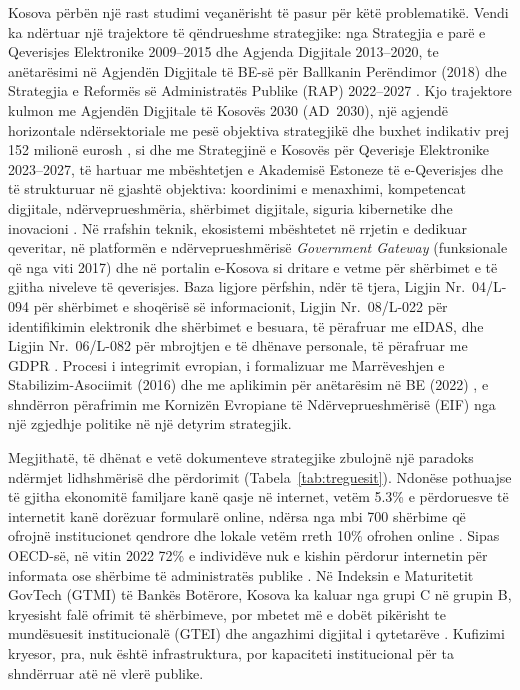\documentclass[conference]{IEEEtran}
\begin{document}
Kosova përbën një rast studimi veçanërisht të pasur për këtë problematikë.
Vendi ka ndërtuar një trajektore të qëndrueshme strategjike: nga Strategjia
e parë e Qeverisjes Elektronike 2009--2015 dhe Agjenda Digjitale 2013--2020,
te anëtarësimi në Agjendën Digjitale të BE-së për Ballkanin Perëndimor
(2018) dhe Strategjia e Reformës së Administratës Publike (RAP) 2022--2027
\cite{strategjia2023}. Kjo trajektore kulmon me Agjendën Digjitale të
Kosovës 2030 (AD~2030), një agjendë horizontale ndërsektoriale me pesë
objektiva strategjikë dhe buxhet indikativ prej 152 milionë eurosh
\cite{agjenda2030}, si dhe me Strategjinë e Kosovës për Qeverisje
Elektronike 2023--2027, të hartuar me mbështetjen e Akademisë Estoneze të
e-Qeverisjes dhe të strukturuar në gjashtë objektiva: koordinimi e
menaxhimi, kompetencat digjitale, ndërveprueshmëria, shërbimet digjitale,
siguria kibernetike dhe inovacioni \cite{strategjia2023}. Në rrafshin
teknik, ekosistemi mbështetet në rrjetin e dedikuar qeveritar, në platformën
e ndërveprueshmërisë \textit{Government Gateway} (funksionale që nga viti
2017) dhe në portalin e-Kosova si dritare e vetme për shërbimet e të gjitha
niveleve të qeverisjes. Baza ligjore përfshin, ndër të tjera, Ligjin
Nr.~04/L-094 për shërbimet e shoqërisë së informacionit, Ligjin Nr.~08/L-022
për identifikimin elektronik dhe shërbimet e besuara, të përafruar me
eIDAS, dhe Ligjin Nr.~06/L-082 për mbrojtjen e të dhënave personale, të
përafruar me GDPR \cite{strategjia2023}. Procesi i integrimit evropian, i
formalizuar me Marrëveshjen e Stabilizim-Asociimit (2016) dhe me aplikimin
për anëtarësim në BE (2022) \cite{ec2024}, e shndërron përafrimin me
Kornizën Evropiane të Ndërveprueshmërisë (EIF) \cite{eif2017} nga një
zgjedhje politike në një detyrim strategjik.

Megjithatë, të dhënat e vetë dokumenteve strategjike zbulojnë një paradoks
ndërmjet lidhshmërisë dhe përdorimit (Tabela~\ref{tab:treguesit}). Ndonëse
pothuajse të gjitha ekonomitë familjare kanë qasje në internet, vetëm
5.3\% e përdoruesve të internetit kanë dorëzuar formularë online, ndërsa nga
mbi 700 shërbime që ofrojnë institucionet qendrore dhe lokale vetëm rreth
10\% ofrohen online \cite{strategjia2023,agjenda2030}. Sipas OECD-së, në vitin
2022 72\% e individëve nuk e kishin përdorur internetin për informata ose
shërbime të administratës publike \cite{oecd2024}. Në Indeksin e Maturitetit
GovTech (GTMI) të Bankës Botërore, Kosova ka kaluar nga grupi C në grupin B,
kryesisht falë ofrimit të shërbimeve, por mbetet më e dobët pikërisht te
mundësuesit institucionalë (GTEI) dhe angazhimi digjital i qytetarëve
\cite{strategjia2023}. Kufizimi kryesor, pra, nuk është infrastruktura, por
kapaciteti institucional për ta shndërruar atë në vlerë publike.
\end{document}
